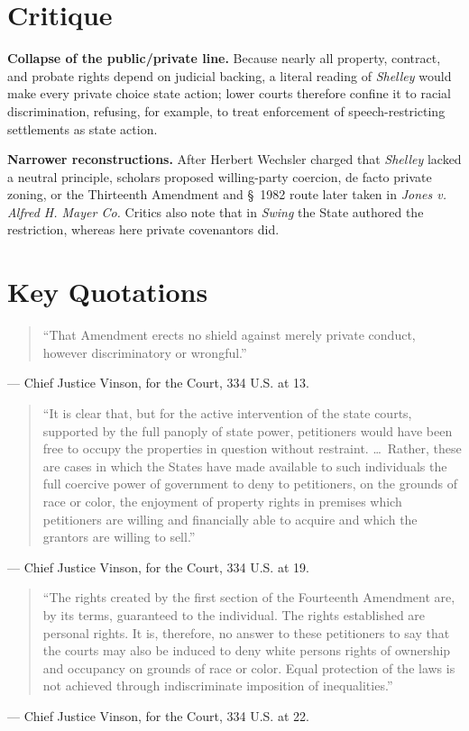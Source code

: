 \documentclass[12pt]{article}
\begin{document}
\section{Critique}

\textbf{Collapse of the public/private line.} Because nearly all property, contract, and probate rights depend on judicial backing, a literal reading of \textit{Shelley} would make every private choice state action; lower courts therefore confine it to racial discrimination, refusing, for example, to treat enforcement of speech-restricting settlements as state action.

\textbf{Narrower reconstructions.} After Herbert Wechsler charged that \textit{Shelley} lacked a neutral principle, scholars proposed willing-party coercion, de facto private zoning, or the Thirteenth Amendment and \S~1982 route later taken in \textit{Jones v. Alfred H. Mayer Co.} Critics also note that in \textit{Swing} the State authored the restriction, whereas here private covenantors did.

\section{Key Quotations}

\begin{quote}
``That Amendment erects no shield against merely private conduct, however discriminatory or wrongful.''
\end{quote}
\noindent --- Chief Justice Vinson, for the Court, 334 U.S. at 13.

\begin{quote}
``It is clear that, but for the active intervention of the state courts, supported by the full panoply of state power, petitioners would have been free to occupy the properties in question without restraint. \ldots\ Rather, these are cases in which the States have made available to such individuals the full coercive power of government to deny to petitioners, on the grounds of race or color, the enjoyment of property rights in premises which petitioners are willing and financially able to acquire and which the grantors are willing to sell.''
\end{quote}
\noindent --- Chief Justice Vinson, for the Court, 334 U.S. at 19.

\begin{quote}
``The rights created by the first section of the Fourteenth Amendment are, by its terms, guaranteed to the individual. The rights established are personal rights. It is, therefore, no answer to these petitioners to say that the courts may also be induced to deny white persons rights of ownership and occupancy on grounds of race or color. Equal protection of the laws is not achieved through indiscriminate imposition of inequalities.''
\end{quote}
\noindent --- Chief Justice Vinson, for the Court, 334 U.S. at 22.
\end{document}
